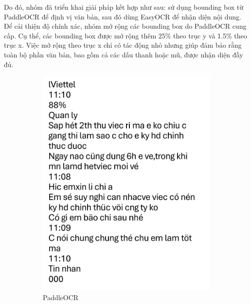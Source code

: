 \documentclass[11pt]{article}
\begin{document}
Do đó, nhóm đã triển khai giải pháp kết hợp như sau: sử dụng bounding box từ PaddleOCR để định vị văn bản, sau đó dùng EasyOCR để nhận diện nội dung. Để cải thiện độ chính xác, nhóm mở rộng các bounding box do PaddleOCR cung cấp. Cụ thể, các bounding box được mở rộng thêm 25\% theo trục y và 1.5\% theo trục x. Việc mở rộng theo trục x chỉ có tác động nhỏ nhưng giúp đảm bảo rằng toàn bộ phần văn bản, bao gồm cả các dấu thanh hoặc mũ, được nhận diện đầy đủ.
\vspace*{-3mm}
\begin{figure}[h!]
    \centering
    \begin{subfigure}{0.3\linewidth}
        \includegraphics[width=\linewidth]{Picture2.png}
        \caption{PaddleOCR}
    \end{subfigure}
    \hfill
    \begin{subfigure}{0.3\linewidth}

\end{subfigure}
\end{figure}
\end{document}
